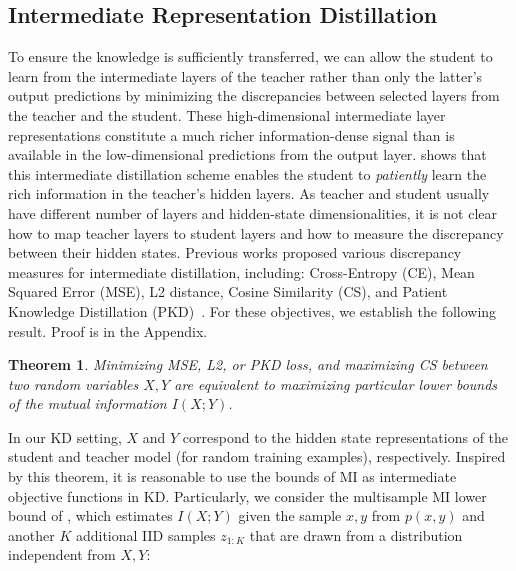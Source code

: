 \documentclass[11pt]{article}
\newtheorem{theorem}{Theorem}
\begin{document}
\subsection{Intermediate Representation Distillation}
To ensure the knowledge is sufficiently transferred, we can allow the student to learn from the intermediate layers of the teacher rather than only the latter's output predictions by minimizing the discrepancies between selected layers from the teacher and the student.
These high-dimensional intermediate layer representations constitute a much richer information-dense signal than is available in the low-dimensional predictions from the output layer. \citet{sun2019patient} shows that this intermediate distillation scheme enables the student to \emph{patiently} learn the rich information in the teacher's hidden layers. As teacher and student usually have different number of layers and hidden-state dimensionalities, it is not clear how to map teacher layers to student layers and how to measure the discrepancy between their hidden states. Previous works proposed various discrepancy measures for intermediate distillation, including:  Cross-Entropy (CE), Mean Squared Error (MSE), L2 distance, Cosine Similarity (CS), and  Patient Knowledge Distillation (PKD)~\citep{sun2019patient}.
For these objectives, we establish the following result. Proof is in the Appendix.

\begin{theorem}
Minimizing MSE, L2, or PKD loss, and maximizing CS between two random variables $X,Y$ are equivalent to maximizing particular lower bounds of the mutual information $I(X;Y)$. 
\label{theorem:unify}
\end{theorem} 
In our KD setting, $X$ and $Y$ correspond to the hidden state representations of the student and teacher model (for random training examples), respectively. 
Inspired by this theorem, it is reasonable to use the bounds of MI as intermediate objective functions in KD. 
Particularly, we consider the multisample MI lower bound of  \citet{poole2019variational}, which estimates $I(X;Y)$ given the sample $x, y$ from $p(x, y)$ and another $K$ additional IID samples $z_{1:{K}}$ that are drawn from a distribution independent from $X, Y$:
\end{document}
